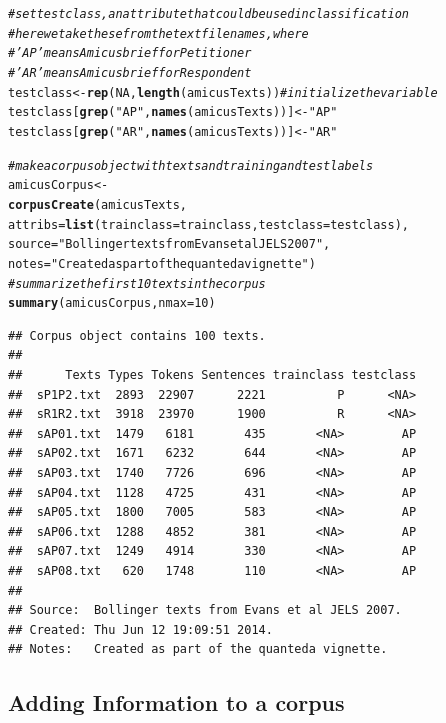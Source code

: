 \documentclass[11pt]{article}\usepackage[]{graphicx}\usepackage[]{color}
\makeatletter
\newcommand{\hlnum}[1]{\textcolor[rgb]{0.686,0.059,0.569}{#1}}%
\newcommand{\hlstr}[1]{\textcolor[rgb]{0.192,0.494,0.8}{#1}}%
\newcommand{\hlcom}[1]{\textcolor[rgb]{0.678,0.584,0.686}{\textit{#1}}}%
\newcommand{\hlstd}[1]{\textcolor[rgb]{0.345,0.345,0.345}{#1}}%
\newcommand{\hlkwb}[1]{\textcolor[rgb]{0.69,0.353,0.396}{#1}}%
\newcommand{\hlkwc}[1]{\textcolor[rgb]{0.333,0.667,0.333}{#1}}%
\newcommand{\hlkwd}[1]{\textcolor[rgb]{0.737,0.353,0.396}{\textbf{#1}}}%
\newenvironment{kframe}{%
 \def\at@end@of@kframe{}%
 \ifinner\ifhmode%
  \def\at@end@of@kframe{\end{minipage}}%
  \begin{minipage}{\columnwidth}%
 \fi\fi%
 \def\FrameCommand##1{\hskip\@totalleftmargin \hskip-\fboxsep
 \colorbox{shadecolor}{##1}\hskip-\fboxsep
     \hskip-\linewidth \hskip-\@totalleftmargin \hskip\columnwidth}%
 \MakeFramed {\advance\hsize-\width
   \@totalleftmargin\z@ \linewidth\hsize
   \@setminipage}}%
 {\par\unskip\endMakeFramed%
 \at@end@of@kframe}
\newenvironment{knitrout}{}{} %
\makeatother
\begin{document}
\begin{knitrout}
\begin{kframe}
\begin{alltt}
\hlcom{# set test class, an attribute that could be used in classification}
\hlcom{# here we take these from the text filenames, where }
\hlcom{# 'AP' means Amicus brief for Petitioner}
\hlcom{# 'AR' means Amicus brief for Respondent}
\hlstd{testclass}  \hlkwb{<-} \hlkwd{rep}\hlstd{(}\hlnum{NA}\hlstd{,} \hlkwd{length}\hlstd{(amicusTexts))} \hlcom{# initialize the variable}
\hlstd{testclass[}\hlkwd{grep}\hlstd{(}\hlstr{"AP"}\hlstd{,} \hlkwd{names}\hlstd{(amicusTexts))]} \hlkwb{<-} \hlstr{"AP"}
\hlstd{testclass[}\hlkwd{grep}\hlstd{(}\hlstr{"AR"}\hlstd{,} \hlkwd{names}\hlstd{(amicusTexts))]} \hlkwb{<-} \hlstr{"AR"}

\hlcom{# make a corpus object with texts and training and test labels}
\hlstd{amicusCorpus} \hlkwb{<-}
  \hlkwd{corpusCreate}\hlstd{(amicusTexts,}
               \hlkwc{attribs} \hlstd{=} \hlkwd{list}\hlstd{(}\hlkwc{trainclass}\hlstd{=trainclass,} \hlkwc{testclass}\hlstd{=testclass),}
               \hlkwc{source} \hlstd{=} \hlstr{"Bollinger texts from Evans et al JELS 2007"}\hlstd{,}
               \hlkwc{notes} \hlstd{=} \hlstr{"Created as part of the quanteda vignette"}\hlstd{)}
\hlcom{# summarize the first 10 texts in the corpus}
\hlkwd{summary}\hlstd{(amicusCorpus,} \hlkwc{nmax}\hlstd{=}\hlnum{10}\hlstd{)}
\end{alltt}
\begin{verbatim}
## Corpus object contains 100 texts.
## 
##      Texts Types Tokens Sentences trainclass testclass
##  sP1P2.txt  2893  22907      2221          P      <NA>
##  sR1R2.txt  3918  23970      1900          R      <NA>
##  sAP01.txt  1479   6181       435       <NA>        AP
##  sAP02.txt  1671   6232       644       <NA>        AP
##  sAP03.txt  1740   7726       696       <NA>        AP
##  sAP04.txt  1128   4725       431       <NA>        AP
##  sAP05.txt  1800   7005       583       <NA>        AP
##  sAP06.txt  1288   4852       381       <NA>        AP
##  sAP07.txt  1249   4914       330       <NA>        AP
##  sAP08.txt   620   1748       110       <NA>        AP
## 
## Source:  Bollinger texts from Evans et al JELS 2007.
## Created: Thu Jun 12 19:09:51 2014.
## Notes:   Created as part of the quanteda vignette.
\end{verbatim}
\end{kframe}
\end{knitrout}

\subsection{Adding Information to a corpus}
\end{document}
